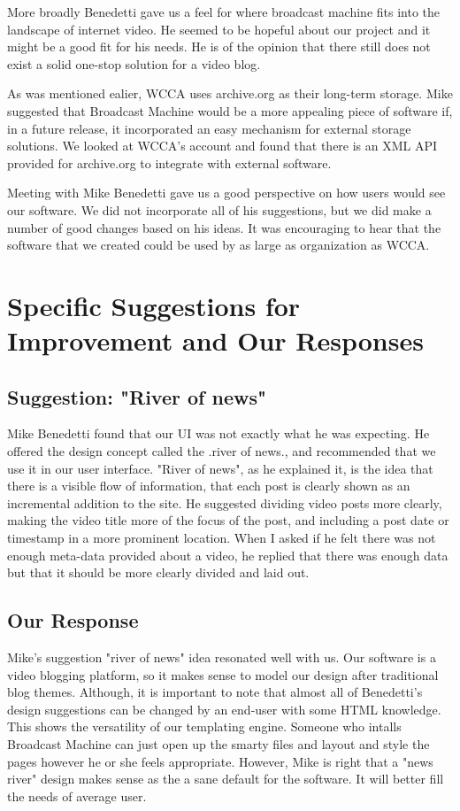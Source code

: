 \documentclass[a4paper,12pt]{report}
\begin{document}
More broadly Benedetti gave us a feel for where broadcast machine fits into the landscape of internet video. 
He seemed to be hopeful about our project and it might be a good fit for his needs.
He is of the opinion that there still does not exist a solid one-stop solution for a video blog. 

As was mentioned ealier, WCCA uses archive.org as their long-term storage. 
Mike suggested that Broadcast Machine would be a more appealing piece of software if, in a future release, it 
incorporated an easy mechanism for external storage solutions. 
We looked at WCCA's account and found that there is an XML API provided for archive.org to integrate with external 
software. 

Meeting with Mike Benedetti gave us a good perspective on how users would see our software. 
We did not incorporate all of his suggestions, but we did make a number of good changes based on his ideas. 
It was encouraging to hear that the software that we created could be used by as large as organization as WCCA.

\section{Specific Suggestions for Improvement and Our Responses}

\subsection{Suggestion: "River of news"}

Mike Benedetti found that our UI was not exactly what he was expecting. 
He offered the design concept called the .river of news., and recommended that we use it in our user interface. 
"River of news", as he explained it, is the idea that there is a visible flow of information, that each post is clearly 
shown as an incremental addition to the site. 
He suggested dividing video posts more clearly, making the video title more of the focus of the post, and including a 
post date or timestamp in a more prominent location. 
When I asked if he felt there was not enough meta-data provided about a video, he replied that there was enough data but 
that it should be more clearly divided and laid out. 

\subsection{Our Response}

Mike's suggestion "river of news" idea resonated well with us. 
Our software is a video blogging platform, so it makes sense to model our design after traditional blog themes. 
Although, it is important to note that almost all of Benedetti's design suggestions can be changed by an end-user with 
some HTML knowledge. 
This shows the versatility of our templating engine. 
Someone who intalls Broadcast Machine can just open up the smarty files and layout and style the pages however he or she 
feels appropriate. 
However, Mike is right that a "news river" design makes sense as the a sane default for the software. 
It will better fill the needs of average user. 
\end{document}

